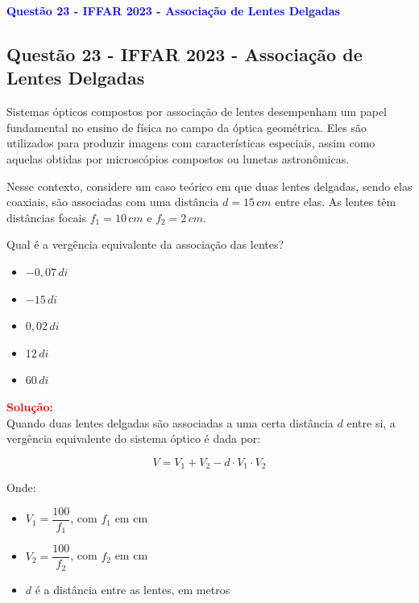 \begin{flushleft}
\textbf{\textcolor{blue}{\Large Quest\~ao 23 - IFFAR 2023 - Associa\c{c}\~ao de Lentes Delgadas}}\\
\noindent

\subsection*{Quest\~ao 23 - IFFAR 2023 - Associa\c{c}\~ao de Lentes Delgadas}

Sistemas \'opticos compostos por associa\c{c}\~ao de lentes desempenham um papel fundamental no ensino de f\'isica 
no campo da \'optica geom\'etrica. Eles s\~ao utilizados para produzir imagens com caracter\'isticas especiais, assim 
como aquelas obtidas por microsc\'opios compostos ou lunetas astron\^omicas.

Nesse contexto, considere um caso te\'orico em que duas lentes delgadas, sendo elas coaxiais, s\~ao associadas com 
uma dist\^ancia $d = 15\,cm$ entre elas. As lentes t\^em dist\^ancias focais $f_1 = 10\,cm$ e $f_2 = 2\,cm$.

Qual \'e a verg\^encia equivalente da associa\c{c}\~ao das lentes?

\begin{itemize}
\item[(A)] $-0{,}07\,di$
\item[(B)] $-15\,di$
\item[(C)] $0{,}02\,di$
\item[(D)] $12\,di$
\item[(E)] $60\,di$
\end{itemize}

\vspace{0.5cm}

\textcolor{red}{\textbf{Solu\c{c}\~ao:}}\\

Quando duas lentes delgadas s\~ao associadas a uma certa dist\^ancia $d$ entre si, a verg\^encia equivalente do sistema \'optico \'{e} dada por:

\[
V = V_1 + V_2 - d \cdot V_1 \cdot V_2
\]

Onde:
\begin{itemize}
    \item $V_1 = \dfrac{100}{f_1}$, com $f_1$ em cm
    \item $V_2 = \dfrac{100}{f_2}$, com $f_2$ em cm
    \item $d$ \'e a dist\^ancia entre as lentes, em metros
\end{itemize}


\end{flushleft}
